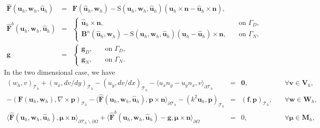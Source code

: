 \documentclass[11pt]{article}
\begin{document}
\begin{equation}
\begin{array}{rcll}
\widehat{\bm{F}} (\bm{u}_h, \bm{w}_h, \widehat{\bm{u}}_h) & = & {\bm{F}} (\widehat{\bm{u}}_h,\bm{w}_h)  - \bm{\mathrm{S}} (\bm{u}_h, \bm{w}_h, \widehat{\bm{u}}_h) (\bm{u}_h \times \bm{n} - \widehat{\bm{u}}_h \times \bm{n}), \\[2ex]
\widehat{\bm{F}}^b(\bm{u}_h, \bm{w}_h, \widehat{\bm{u}}_h)  & = & 
\left\{
\begin{array}{ll} 
\widehat{\bm{u}}_h \times \bm{n}, & \quad  \mbox{on } \Gamma_D, \\
\bm{B}^n(\widehat{\bm{u}}_h,\bm{w}_h)  -\bm{\mathrm{S}} (\bm{u}_h, \bm{w}_h,\widehat{\bm{u}}_h) (\bm{u}_h - \widehat{\bm{u}}_h) \times \bm{n}, & \quad \mbox{on }   \Gamma_N,  
\end{array}
\right. \\[3ex]
\bm{g} & = & 
\left\{
\begin{array}{ll} 
\bm{g}_D , & \quad  \mbox{on } \Gamma_D, \\
\bm{g}_N, & \quad \mbox{on }   \Gamma_N .  
\end{array}
\right.
\end{array}
\end{equation}
In the two dimensional case, we have
\begin{equation}
\begin{array}{rcll}
(w_h, {v})_{\mathcal{T}_h} + (u_x, dv/dy)_{\mathcal{T}_h} - (u_y, dv/dx)_{\mathcal{T}_h} - \langle u_x n_y - u_y n_x, v \rangle_{\partial \mathcal{T}_h}  & = & \bm{0}, & \quad \forall \bm{v} \in \bm{V}_h, \\[2ex] 
-(\bm{F} (\bm{u}_h,\bm{w}_h), \nabla \times \bm{p})_{\mathcal{T}_h} - \langle \widehat{\bm{F}} (\bm{u}_h, \bm{w}_h ,\widehat{\bm{u}}_h)  , \bm{p} \times \bm{n}\rangle_{\partial \mathcal{T}_h} - ( k^2 \bm{u}_h, \bm{p})_{\mathcal{T}_h} & = & (\bm{f}, \bm{p})_{\mathcal{T}_h}, & \quad \forall \bm{w} \in \bm{W}_h, \\[2ex]
\langle \widehat{\bm{F}} (\bm{u}_h,\bm{w}_h, \widehat{\bm{u}}_h) , \bm{\mu} \times \bm{n} \rangle_{\partial \mathcal{T}_h \backslash \partial \Omega} + \langle \widehat{\bm{F}}^b(\bm{u}_h, \bm{w}_h, \widehat{\bm{u}}_h) - \bm{g}, \bm{\mu} \times \bm{n} \rangle_{\partial \Omega}  & = & 0, & \quad \forall \bm{\mu} \in \bm{M}_h ,
\end{array}
\end{equation}
\end{document}

